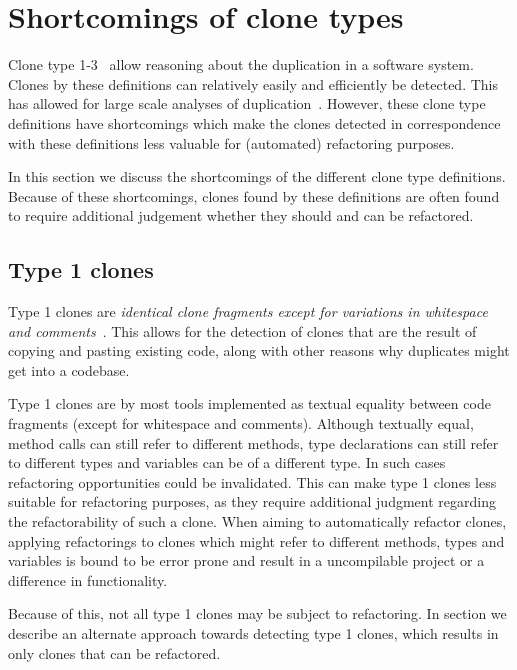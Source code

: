 \documentclass[a4paper]{article}
\begin{document}
\section{Shortcomings of clone types}
Clone type 1-3~\cite{roy2007survey} allow reasoning about the duplication in a software system. Clones by these definitions can relatively easily and efficiently be detected. This has allowed for large scale analyses of duplication~\cite{livieri2007very}. However, these clone type definitions have shortcomings which make the clones detected in correspondence with these definitions less valuable for (automated) refactoring purposes.

In this section we discuss the shortcomings of the different clone type definitions. Because of these shortcomings, clones found by these definitions are often found to require additional judgement whether they should and can be refactored.

\subsection{Type 1 clones} \label{sec:type1}
Type 1 clones are \textit{identical clone fragments except for variations in whitespace and comments}~\cite{roy2007survey}. This allows for the detection of clones that are the result of copying and pasting existing code, along with other reasons why duplicates might get into a codebase.

Type 1 clones are by most tools implemented as textual equality between code fragments (except for whitespace and comments). Although textually equal, method calls can still refer to different methods, type declarations can still refer to different types and variables can be of a different type. In such cases refactoring opportunities could be invalidated. This can make type 1 clones less suitable for refactoring purposes, as they require additional judgment regarding the refactorability of such a clone. When aiming to automatically refactor clones, applying refactorings to clones which might refer to different methods, types and variables is bound to be error prone and result in a uncompilable project or a difference in functionality.

Because of this, not all type 1 clones may be subject to refactoring. In section \label{chap:type1rclones} we describe an alternate approach towards detecting type 1 clones, which results in only clones that can be refactored.
\end{document}
